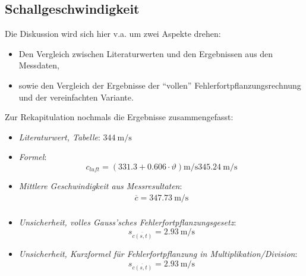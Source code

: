 \subsection{Schallgeschwindigkeit}

Die Diskussion wird sich hier v.a. um zwei Aspekte drehen:

\begin{itemize}
    \item
        Den  Vergleich zwischen  Literaturwerten und  den Ergebnissen  aus den
        Messdaten,
    \item
        sowie     den    Vergleich     der    Ergebnisse     der    ``vollen''
        Fehlerfortpflanzungsrechnung und der vereinfachten Variante.
\end{itemize}

Zur Rekapitulation nochmals die Ergebnisse zusammengefasst:

\begin{itemize}
    \item
        \emph{Literaturwert, Tabelle}: $\SI{344}{\meter\per\second}$
    \item
        \emph{Formel}:
        \begin{equation}
            \label{eq:schallgeschwTemperatur2}
            c_{luft} = (331.3 + 0.606 \cdot \vartheta) \si{\meter\per\second} \SI{345.24}{\meter\per\second}
        \end{equation}
    \item
        \emph{Mittlere Geschwindigkeit aus Messresultaten}:
        \begin{gather*}
            \overline{c} = \SI{347.73}{\meter\per\second} \\
        \end{gather*}
    \item
        \emph{Unsicherheit, volles Gauss'sches Fehlerfortpflanzungsgesetz}:
        \begin{equation*}
            s_{\overline{c(s,t)}} = \SI{2.93}{\meter\per\second}
        \end{equation*}
    \item
        \emph{Unsicherheit, Kurzformel f\"ur Fehlerfortpflanzung in Multiplikation/Division}:
        \begin{equation*}
            s_{\overline{c(s,t)}} = \SI{2.93}{\meter\per\second}
        \end{equation*}
\end{itemize}

